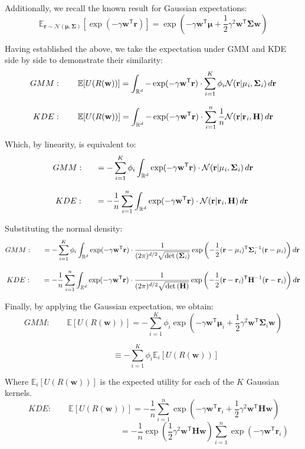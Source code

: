 Additionally, we recall the known result for Gaussian expectations:
$$\mathbb{E}_{\mathbf{r}\sim\mathcal{N}(\mathbf{\mu,\Sigma})}[\exp(-\gamma\mathbf{w}^{\mathsf{T}}\mathbf{r})]=\exp\left(-\gamma\mathbf{w}^{\mathsf{T}}\mathbf{\mu}+\frac{1}{2}\gamma^2\mathbf{w}^{\mathsf{T}}\mathbf{\Sigma}\mathbf{w}\right)$$

Having established the above, we take the expectation under GMM and KDE side by side to demonstrate their similarity:
$$GMM:\qquad\mathbb{E}[U(R(\mathbf{w}))]=\int_{\mathbb{R}^{d}}-\exp(-\gamma\mathbf{w}^{\mathsf{T}}\mathbf{r})\cdot\sum_{i=1}^{K}\phi_{i} \mathcal{N}(\mathbf{r|\mu_{\it{i}},\Sigma_{\it{i}}})\,d\mathbf{r}$$

$$\,KDE:\qquad\mathbb{E}[U(R(\mathbf{w}))]=\int_{\mathbb{R}^{d}}-\exp(-\gamma\mathbf{w}^{\mathsf{T}}\mathbf{r})\cdot \sum_{i=1}^{n}\frac{1}{n}\mathcal{N}(\mathbf{r|r_{\it{i}},H})\,d\mathbf{r}\,$$

Which, by linearity, is equivalent to:
$$GMM:\qquad=-\sum_{i=1}^{K}\phi_{i}\int_{\mathbb{R}^{d}}\exp(-\gamma\mathbf{w}^{\mathsf{T}}\mathbf{r})\cdot \mathcal{N}(\mathbf{r|\mu_{\it{i}},\Sigma_{\it{i}}})\,d\mathbf{r}$$

$$\,KDE:\qquad=-\frac{1}{n}\sum_{i=1}^{n}\int_{\mathbb{R}^{d}}\exp(-\gamma\mathbf{w}^{\mathsf{T}}\mathbf{r})\cdot \mathcal{N}(\mathbf{r|r_{\it{i}},H})\,d\mathbf{r}\,\,\,$$

Substituting the normal density:
$$GMM:\qquad=-\sum_{i=1}^{K}\phi_{i}\int_{\mathbb{R}^{d}}\exp(-\gamma\mathbf{w}^{\mathsf{T}}\mathbf{r})\cdot \frac{1}{(2\pi)^{d/2}\sqrt{\det{(\mathbf{\Sigma_{\it{i}}})}}}\exp\left(-\frac{1}{2}\mathbf{(r-\mu_{\it{i}})^\mathsf{T}\Sigma_{\it{i}}^\mathrm{-1}(r-\mu_{\it{i}})}\right)d\mathbf{r}\,$$

$$\,KDE:\qquad\displaystyle=-\frac{1}{n}\sum_{i=1}^{n}\int_{\mathbb{R}^{d}}\exp(-\gamma\mathbf{w}^{\mathsf{T}}\mathbf{r})\cdot\frac{1}{(2\pi)^{d/2}\sqrt{\det{(\mathbf{H})}}}\exp\left(-\frac{1}{2}\mathbf{(r-r_{\it{i}})^\mathsf{T}H^\mathrm{-1}(r-r_{\it{i}})}\right)d\mathbf{r}\,$$

Finally, by applying the Gaussian expectation, we obtain:
$$GMM:\qquad\mathbb{E}[U(R(\mathbf{w}))]=-\sum_{i=1}^{K}\phi_{i}\exp\left(-\gamma\mathbf{w}^{\mathsf{T}}\mathbf{\mu}_i+\frac{1}{2}\gamma^2\mathbf{w}^{\mathsf{T}}\mathbf{\Sigma}_i\mathbf{w}\right)$$

$$\qquad\quad\equiv-\sum_{i=1}^{K}\phi_{i}\mathbb{E}_{i}[U(R(\mathbf{w}))]$$

Where $\mathbb{E}_{i}[U(R(\mathbf{w}))]$ is the expected utility for each of the $K$ Gaussian kernels.
$$\,KDE:\qquad\mathbb{E}[U(R(\mathbf{w}))]=-\frac{1}{n}\sum_{i=1}^{n}\exp\left(-\gamma\mathbf{w}^{\mathsf{T}}\mathbf{r}_i+\frac{1}{2}\gamma^2\mathbf{w}^{\mathsf{T}}\mathbf{H}\mathbf{w}\right)$$
$$\qquad\qquad\qquad\qquad\qquad\qquad\,\,=-\frac{1}{n}\exp\left(\frac{1}{2}\gamma^2\mathbf{w}^{\mathsf{T}}\mathbf{H}\mathbf{w}\right)\sum_{i=1}^{n}\exp\left(-\gamma\mathbf{w}^{\mathsf{T}}\mathbf{r}_i\right)$$


